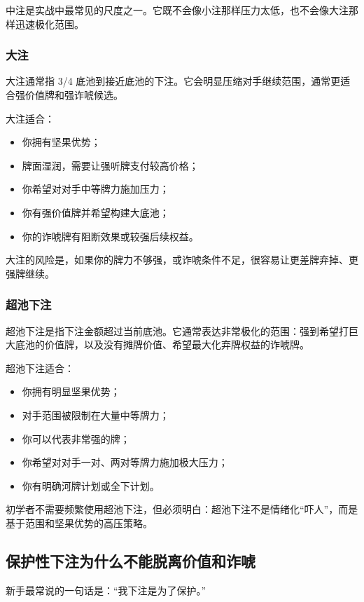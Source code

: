 中注是实战中最常见的尺度之一。它既不会像小注那样压力太低，也不会像大注那样迅速极化范围。

\subsubsection*{大注}

大注通常指 3/4 底池到接近底池的下注。它会明显压缩对手继续范围，通常更适合强价值牌和强诈唬候选。

大注适合：

\begin{itemize}
\item 你拥有坚果优势；
\item 牌面湿润，需要让强听牌支付较高价格；
\item 你希望对对手中等牌力施加压力；
\item 你有强价值牌并希望构建大底池；
\item 你的诈唬牌有阻断效果或较强后续权益。
\end{itemize}

大注的风险是，如果你的牌力不够强，或诈唬条件不足，很容易让更差牌弃掉、更强牌继续。

\subsubsection*{超池下注}

超池下注是指下注金额超过当前底池。它通常表达非常极化的范围：强到希望打巨大底池的价值牌，以及没有摊牌价值、希望最大化弃牌权益的诈唬牌。

超池下注适合：

\begin{itemize}
\item 你拥有明显坚果优势；
\item 对手范围被限制在大量中等牌力；
\item 你可以代表非常强的牌；
\item 你希望对对手一对、两对等牌力施加极大压力；
\item 你有明确河牌计划或全下计划。
\end{itemize}

初学者不需要频繁使用超池下注，但必须明白：超池下注不是情绪化“吓人”，而是基于范围和坚果优势的高压策略。

\subsection{保护性下注为什么不能脱离价值和诈唬}

新手最常说的一句话是：“我下注是为了保护。”


